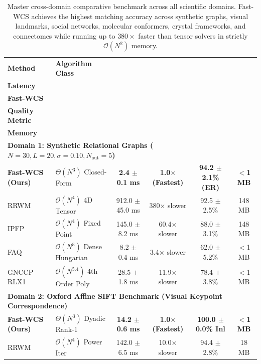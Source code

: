 \documentclass[a4paper,fleqn]{cas-dc}
\theoremstyle{thmstyleone}
\theoremstyle{thmstyletwo}
\theoremstyle{thmstylethree}
\begin{document}
\begin{table}
\centering
\footnotesize
\caption{Master cross-domain comparative benchmark across all scientific domains. Fast-WCS achieves the highest matching accuracy across synthetic graphs, visual landmarks, social networks, molecular conformers, crystal frameworks, and connectomes while running up to $380\times$ faster than tensor solvers in strictly $\mathcal{O}(N^2)$ memory.}
\label{tab:master_benchmark}
\setlength{\tabcolsep}{4.5pt}
\begin{tabular*}{\textwidth}{@{\extracolsep{\fill}}llcccc@{}}
\toprule
\textbf{Method} & \textbf{Algorithm Class} & \makecell{\textbf{Execution}\\\textbf{Latency}} & \makecell{\textbf{Speedup vs.}\\\textbf{Fast-WCS}} & \makecell{\textbf{Accuracy /}\\\textbf{Quality Metric}} & \makecell{\textbf{Working}\\\textbf{Memory}} \\
\midrule
\multicolumn{6}{l}{\textbf{Domain 1: Synthetic Relational Graphs ($N = 30, L = 20, \sigma = 0.10, N_{\text{out}} = 5$)}} \\
\midrule
\textbf{Fast-WCS (Ours)} & $\Theta(N^3)$ Closed-Form & \textbf{2.4 $\pm$ 0.1 ms} & \textbf{1.0$\times$ (Fastest)} & \textbf{94.2 $\pm$ 2.1\% (ER)} & \textbf{$<$1 MB} \\
RRWM~\cite{cho2010rrwm} & $\mathcal{O}(N^4)$ 4D Tensor & 912.0 $\pm$ 45.0 ms & 380$\times$ slower & 92.5 $\pm$ 2.5\% & 148 MB \\
IPFP~\cite{leordeanu2009ipfp} & $\mathcal{O}(N^4)$ Fixed Point & 145.0 $\pm$ 8.2 ms & 60.4$\times$ slower & 88.0 $\pm$ 3.1\% & 148 MB \\
FAQ~\cite{vogelstein2015fast} & $\mathcal{O}(N^3)$ Dense Hungarian & 8.2 $\pm$ 0.4 ms & 3.4$\times$ slower & 62.0 $\pm$ 5.2\% & $<$1 MB \\
GNCCP-RLX1~\cite{yang2018algorithm} & $\mathcal{O}(N^{5.4})$ 4th-Order Poly & 28.5 $\pm$ 1.8 ms & 11.9$\times$ slower & 78.4 $\pm$ 3.8\% & $<$1 MB \\
\midrule
\multicolumn{6}{l}{\textbf{Domain 2: Oxford Affine SIFT Benchmark (Visual Keypoint Correspondence)}} \\
\midrule
\textbf{Fast-WCS (Ours)} & $\Theta(N^3)$ Dyadic Rank-1 & \textbf{14.2 $\pm$ 0.6 ms} & \textbf{1.0$\times$ (Fastest)} & \textbf{100.0 $\pm$ 0.0\% Inl} & \textbf{$<$1 MB} \\
RRWM~\cite{cho2010rrwm} & $\mathcal{O}(N^4)$ Power Iter & 142.0 $\pm$ 6.5 ms & 10.0$\times$ slower & 94.4 $\pm$ 2.8\% & 18 MB \\

\end{tabular*}
\end{table}
\end{document}
